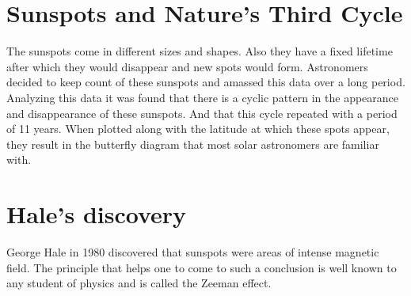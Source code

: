 \documentclass{../template/texnote}
\begin{document}
\section{Sunspots and Nature's Third Cycle}
The sunspots come in different sizes  and shapes.
Also they have a fixed lifetime after which they would disappear and new spots would form.
Astronomers decided to keep count of these sunspots and amassed this data over a long period.
Analyzing this data it was found that there is a cyclic pattern in the appearance and disappearance of these sunspots.
And that this cycle repeated with a period of 11 years.
When plotted along with the latitude at which these spots appear, they result in the butterfly diagram that most solar astronomers are familiar with.

\section{Hale's discovery}
George Hale in 1980 discovered that sunspots were areas of intense magnetic field.
The principle that helps one to come to such a conclusion is well known to any student of physics and is called the Zeeman effect.

    \printbibliography
\end{document}

